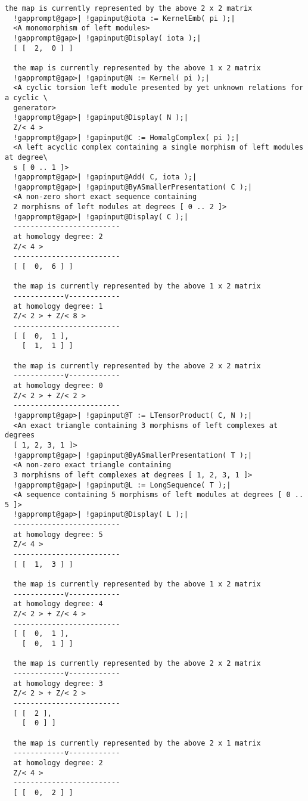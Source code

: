 \documentclass[a4paper,11pt]{report}
\begin{document}
{{{\begin{Verbatim}[commandchars=!@|,fontsize=\small,frame=single,label=Example]
  the map is currently represented by the above 2 x 2 matrix
  !gapprompt@gap>| !gapinput@iota := KernelEmb( pi );|
  <A monomorphism of left modules>
  !gapprompt@gap>| !gapinput@Display( iota );|
  [ [  2,  0 ] ]
  
  the map is currently represented by the above 1 x 2 matrix
  !gapprompt@gap>| !gapinput@N := Kernel( pi );|
  <A cyclic torsion left module presented by yet unknown relations for a cyclic \
  generator>
  !gapprompt@gap>| !gapinput@Display( N );|
  Z/< 4 >
  !gapprompt@gap>| !gapinput@C := HomalgComplex( pi );|
  <A left acyclic complex containing a single morphism of left modules at degree\
  s [ 0 .. 1 ]>
  !gapprompt@gap>| !gapinput@Add( C, iota );|
  !gapprompt@gap>| !gapinput@ByASmallerPresentation( C );|
  <A non-zero short exact sequence containing
  2 morphisms of left modules at degrees [ 0 .. 2 ]>
  !gapprompt@gap>| !gapinput@Display( C );|
  -------------------------
  at homology degree: 2
  Z/< 4 >
  -------------------------
  [ [  0,  6 ] ]
  
  the map is currently represented by the above 1 x 2 matrix
  ------------v------------
  at homology degree: 1
  Z/< 2 > + Z/< 8 >
  -------------------------
  [ [  0,  1 ],
    [  1,  1 ] ]
  
  the map is currently represented by the above 2 x 2 matrix
  ------------v------------
  at homology degree: 0
  Z/< 2 > + Z/< 2 >
  -------------------------
  !gapprompt@gap>| !gapinput@T := LTensorProduct( C, N );|
  <An exact triangle containing 3 morphisms of left complexes at degrees
  [ 1, 2, 3, 1 ]>
  !gapprompt@gap>| !gapinput@ByASmallerPresentation( T );|
  <A non-zero exact triangle containing
  3 morphisms of left complexes at degrees [ 1, 2, 3, 1 ]>
  !gapprompt@gap>| !gapinput@L := LongSequence( T );|
  <A sequence containing 5 morphisms of left modules at degrees [ 0 .. 5 ]>
  !gapprompt@gap>| !gapinput@Display( L );|
  -------------------------
  at homology degree: 5
  Z/< 4 >
  -------------------------
  [ [  1,  3 ] ]
  
  the map is currently represented by the above 1 x 2 matrix
  ------------v------------
  at homology degree: 4
  Z/< 2 > + Z/< 4 >
  -------------------------
  [ [  0,  1 ],
    [  0,  1 ] ]
  
  the map is currently represented by the above 2 x 2 matrix
  ------------v------------
  at homology degree: 3
  Z/< 2 > + Z/< 2 >
  -------------------------
  [ [  2 ],
    [  0 ] ]
  
  the map is currently represented by the above 2 x 1 matrix
  ------------v------------
  at homology degree: 2
  Z/< 4 >
  -------------------------
  [ [  0,  2 ] ]
  

\end{Verbatim}}}}
\end{document}
